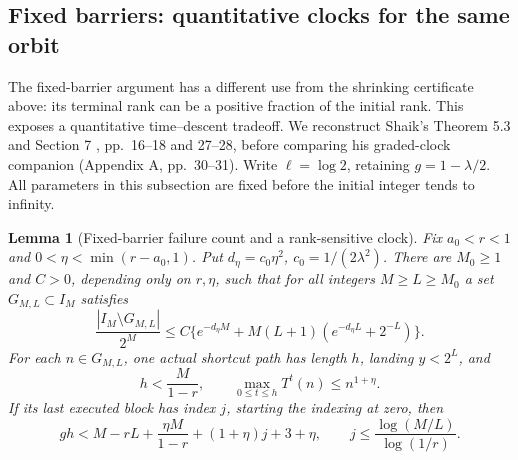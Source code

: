 \documentclass[11pt]{article}
\newtheorem{lemma}[proposition]{Lemma}
\theoremstyle{remark}\newtheorem{remark}[proposition]{Remark}
\begin{document}
\subsection{Fixed barriers: quantitative clocks for the same orbit}
\label{subsec:shaik-fixed-barrier}
The fixed-barrier argument has a different use from the shrinking
certificate above: its terminal rank can be a positive fraction of the
initial rank. This exposes a quantitative time--descent tradeoff.
We reconstruct Shaik's Theorem 5.3 and Section 7
\cite{Shaik2026v324}, pp.~16--18 and 27--28, before comparing
his graded-clock companion (Appendix A, pp.~30--31).
Write \(\ell=\log2\), retaining \(g=1-\lambda/2\).
All parameters in this subsection are fixed before the initial integer
tends to infinity.

\begin{lemma}[Fixed-barrier failure count and a rank-sensitive clock]
\label{lem:shaik-fixed-barrier}
Fix \(a_0<r<1\) and \(0<\eta<\min(r-a_0,1)\). Put
\(d_\eta=c_0\eta^2\), \(c_0=1/(2\lambda^2)\).
There are \(M_0\ge1\) and \(C>0\), depending only on \(r,\eta\),
such that for all integers \(M\ge L\ge M_0\) a set
\(G_{M,L}\subset I_M\) satisfies
\begin{equation}\label{eq:shaik-fixed-failure}
 \frac{|I_M\setminus G_{M,L}|}{2^M}
 \le C\{e^{-d_\eta M}
       +M(L+1)(e^{-d_\eta L}+2^{-L})\}.
\end{equation}
For each \(n\in G_{M,L}\), one actual shortcut path has length \(h\),
landing \(y<2^L\), and
\begin{equation}\label{eq:shaik-fixed-witness}
 h<\frac{M}{1-r},\qquad
 \max_{0\le t\le h}T^t(n)\le n^{1+\eta}.
\end{equation}
If its last executed block has index \(j\), starting the indexing at zero,
then
\begin{equation}\label{eq:shaik-fixed-clock}
 gh<M-rL+\frac{\eta M}{1-r}+(1+\eta)j+3+\eta,\qquad
 j\le\frac{\log(M/L)}{\log(1/r)}.
\end{equation}
\end{lemma}
\end{document}
